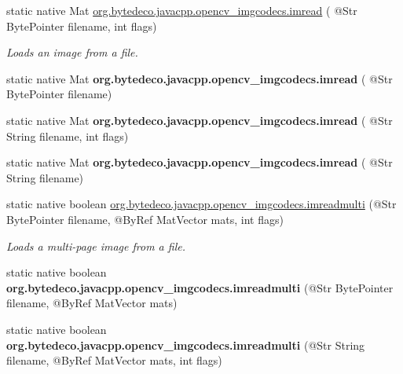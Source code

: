 \begin{DoxyCompactItemize}
\item 
static native Mat \hyperlink{group__imgcodecs_gab0d3350cc2fd1d26eaae6aeb9df1f14e}{org.\+bytedeco.\+javacpp.\+opencv\+\_\+imgcodecs.\+imread} ( @Str Byte\+Pointer filename, int flags)
\begin{DoxyCompactList}\small\item\em Loads an image from a file. \end{DoxyCompactList}\item 
\mbox{\label{group__imgcodecs_gae95d90996a32ac5e9811a5cd88e39922}} 
static native Mat {\bfseries org.\+bytedeco.\+javacpp.\+opencv\+\_\+imgcodecs.\+imread} ( @Str Byte\+Pointer filename)
\item 
\mbox{\label{group__imgcodecs_ga4d49492b6b516bd6f84eb95d3393c411}} 
static native Mat {\bfseries org.\+bytedeco.\+javacpp.\+opencv\+\_\+imgcodecs.\+imread} ( @Str String filename, int flags)
\item 
\mbox{\label{group__imgcodecs_gacbd10e41cca808c986e340402f857e33}} 
static native Mat {\bfseries org.\+bytedeco.\+javacpp.\+opencv\+\_\+imgcodecs.\+imread} ( @Str String filename)
\item 
static native boolean \hyperlink{group__imgcodecs_ga4e94bb9f788558a0b9eb892cc7a33bb9}{org.\+bytedeco.\+javacpp.\+opencv\+\_\+imgcodecs.\+imreadmulti} (@Str Byte\+Pointer filename, @By\+Ref Mat\+Vector mats, int flags)
\begin{DoxyCompactList}\small\item\em Loads a multi-\/page image from a file. \end{DoxyCompactList}\item 
\mbox{\label{group__imgcodecs_gad01ab1288d5c522e7ab83e14bb66e367}} 
static native boolean {\bfseries org.\+bytedeco.\+javacpp.\+opencv\+\_\+imgcodecs.\+imreadmulti} (@Str Byte\+Pointer filename, @By\+Ref Mat\+Vector mats)
\item 
\mbox{\label{group__imgcodecs_gaf4a78768e82dfb180a168b4a3fe20a3e}} 
static native boolean {\bfseries org.\+bytedeco.\+javacpp.\+opencv\+\_\+imgcodecs.\+imreadmulti} (@Str String filename, @By\+Ref Mat\+Vector mats, int flags)
\item 

\end{DoxyCompactItemize}
